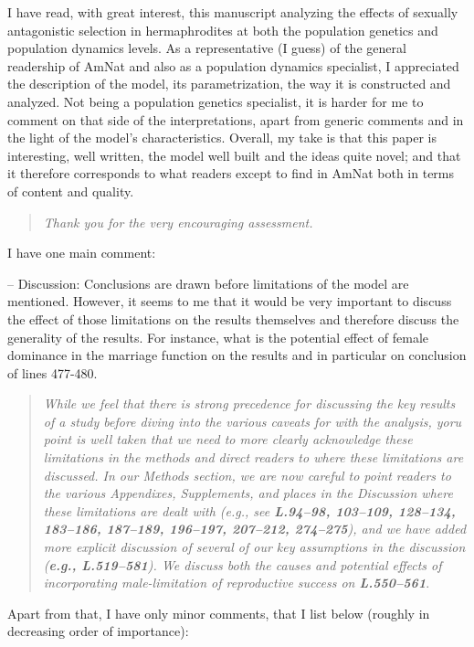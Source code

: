 \documentclass[11pt]{article}
\begin{document}
I have read, with great interest, this manuscript analyzing the effects of sexually antagonistic selection in hermaphrodites at both the population genetics and population dynamics levels. As a representative (I guess) of the general readership of AmNat and also as a population dynamics specialist, I appreciated the description of the model, its parametrization, the way it is constructed and analyzed. Not being a population genetics specialist, it is harder for me to comment on that side of the interpretations, apart from generic comments and in the light of the model’s characteristics. Overall, my take is that this paper is interesting, well written, the model well built and the ideas quite novel; and that it therefore corresponds to what readers except to find in AmNat both in terms of content and quality.

\begin{quote}
	{\itshape Thank you for the very encouraging assessment.}
\end{quote}

\noindent I have one main comment:

\noindent-- Discussion: Conclusions are drawn before limitations of the model are mentioned. However, it seems to me that it would be very important to discuss the effect of those limitations on the results themselves and therefore discuss the generality of the results. For instance, what is the potential effect of female dominance in the marriage function on the results and in particular on conclusion of lines 477-480.

\begin{quote}
	{\itshape While we feel that there is strong precedence for discussing the key results of a study before diving into the various caveats for with the analysis, yoru point is well taken that we need to more clearly acknowledge these limitations in the methods and direct readers to where these limitations are discussed. In our Methods section, we are now careful to point readers to the various Appendixes, Supplements, and places in the Discussion where these limitations are dealt with (e.g., see {\bf L.94--98, 103--109, 128--134, 183--186, 187--189, 196--197, 207--212, 274--275}), and we have added more explicit discussion of several of our key assumptions in the discussion ({\bf e.g., L.519--581}). We discuss both the causes and potential effects of incorporating male-limitation of reproductive success on {\bf L.550--561}}.
\end{quote}

\noindent Apart from that, I have only minor comments, that I list below (roughly in decreasing order of importance):
\bigskip 
\end{document}
